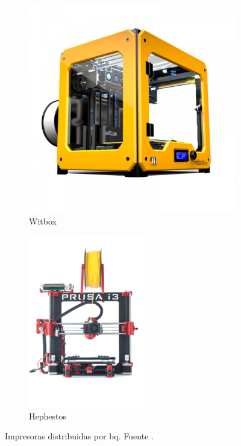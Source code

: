 \begin{figure}[H]
                      \centering
                        \begin{subfigure}[b]{0.5\textwidth}
                            \centering
                            \includegraphics[width=.4\linewidth]{images/Witbox.jpg}
                            \caption{Witbox}
                            \label{fig:estado_witbox}
                        \end{subfigure}
                        
                        \begin{subfigure}[b]{0.5\textwidth}
                                \centering
                            \includegraphics[width=.4\linewidth]{images/190px-HEPHESTOS.png}
                            \caption{Hephestos}
                            \label{fig:estado_hephestos}
                        \end{subfigure}
                        \caption{Impresoras distribuidas por bq. Fuente \cite{bq}.}
                        \label{fig:estado_impresoras_bq}
            \end{figure}

